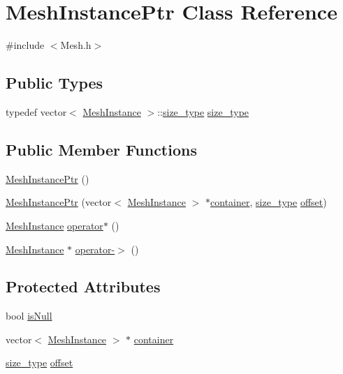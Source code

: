 \hypertarget{class_mesh_instance_ptr}{}\section{Mesh\+Instance\+Ptr Class Reference}
\label{class_mesh_instance_ptr}


{\ttfamily \#include $<$Mesh.\+h$>$}

\subsection*{Public Types}
\begin{DoxyCompactItemize}
\item 
typedef vector$<$ \hyperlink{class_mesh_instance}{Mesh\+Instance} $>$\+::\hyperlink{class_mesh_instance_ptr_adec11b2e0c0dd52620a5672406a2ad4f}{size\+\_\+type} \hyperlink{class_mesh_instance_ptr_adec11b2e0c0dd52620a5672406a2ad4f}{size\+\_\+type}
\end{DoxyCompactItemize}
\subsection*{Public Member Functions}
\begin{DoxyCompactItemize}
\item 
\hyperlink{class_mesh_instance_ptr_ac1d5253802ac00867f05e966d9837946}{Mesh\+Instance\+Ptr} ()
\item 
\hyperlink{class_mesh_instance_ptr_aec9e641cbf2233a9adcc704d368fd6c9}{Mesh\+Instance\+Ptr} (vector$<$ \hyperlink{class_mesh_instance}{Mesh\+Instance} $>$ $\ast$\hyperlink{class_mesh_instance_ptr_ae87840735de9302d2011731219da5fd4}{container}, \hyperlink{class_mesh_instance_ptr_adec11b2e0c0dd52620a5672406a2ad4f}{size\+\_\+type} \hyperlink{class_mesh_instance_ptr_ad99534feeaecaafcf4d8329723de2ffd}{offset})
\item 
\hyperlink{class_mesh_instance}{Mesh\+Instance} \hyperlink{class_mesh_instance_ptr_a143f878734446121cb88b56627d4829b}{operator$\ast$} ()
\item 
\hyperlink{class_mesh_instance}{Mesh\+Instance} $\ast$ \hyperlink{class_mesh_instance_ptr_acb4b080f0cfa0e29bd27aa0e8f984a29}{operator-\/$>$} ()
\end{DoxyCompactItemize}
\subsection*{Protected Attributes}
\begin{DoxyCompactItemize}
\item 
bool \hyperlink{class_mesh_instance_ptr_a64b684e33c846dbcdff7b53188d41238}{is\+Null}
\item 
vector$<$ \hyperlink{class_mesh_instance}{Mesh\+Instance} $>$ $\ast$ \hyperlink{class_mesh_instance_ptr_ae87840735de9302d2011731219da5fd4}{container}
\item 
\hyperlink{class_mesh_instance_ptr_adec11b2e0c0dd52620a5672406a2ad4f}{size\+\_\+type} \hyperlink{class_mesh_instance_ptr_ad99534feeaecaafcf4d8329723de2ffd}{offset}
\end{DoxyCompactItemize}


